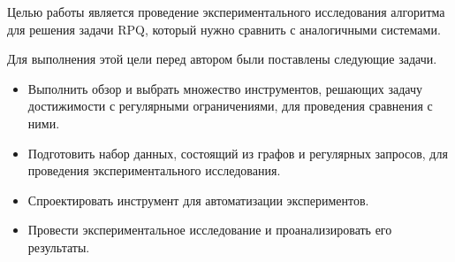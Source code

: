
\label{sec:task}
Целью работы является проведение экспериментального исследования алгоритма для решения задачи RPQ, который нужно сравнить с аналогичными системами.

Для выполнения этой цели перед автором были поставлены следующие задачи.

\begin{itemize}
    \item  Выполнить обзор и выбрать множество инструментов, решающих задачу достижимости с регулярными ограничениями, для проведения сравнения с ними.
    \item  Подготовить набор данных, состоящий из графов и регулярных запросов, для проведения экспериментального исследования.
    \item Спроектировать инструмент для автоматизации экспериментов.
    \item Провести экспериментальное исследование и проанализировать его результаты.
\end{itemize}
